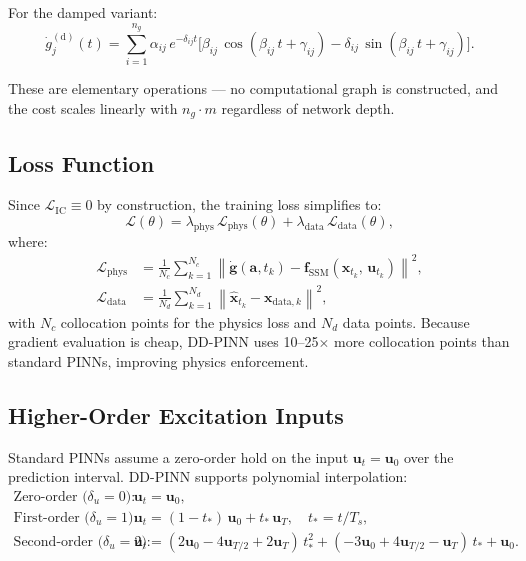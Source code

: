 \documentclass[11pt]{article}
\newcommand{\xhat}{\hat{\bm{x}}}
\newcommand{\avec}{\bm{a}}
\newcommand{\uvec}{\bm{u}}
\newcommand{\xvec}{\bm{x}}
\newcommand{\fssm}{\bm{f}_{\mathrm{SSM}}}
\begin{document}
For the damped variant:
\begin{equation}
    \dot{g}_j^{(\mathrm{d})}(t) = \sum_{i=1}^{n_g} \alpha_{ij}\, e^{-\delta_{ij} t} \Big[ \beta_{ij}\, \cos(\beta_{ij}\, t + \gamma_{ij}) - \delta_{ij}\, \sin(\beta_{ij}\, t + \gamma_{ij}) \Big].
    \label{eq:closed-form-grad-damped}
\end{equation}

These are elementary operations --- no computational graph is constructed, and the cost scales linearly with $n_g \cdot m$ regardless of network depth.

\subsection{Loss Function}

Since $\mathcal{L}_{\mathrm{IC}} \equiv 0$ by construction, the training loss simplifies to:
\begin{equation}
    \mathcal{L}(\theta) = \lambda_{\mathrm{phys}}\, \mathcal{L}_{\mathrm{phys}}(\theta) + \lambda_{\mathrm{data}}\, \mathcal{L}_{\mathrm{data}}(\theta),
    \label{eq:ddpinn-loss}
\end{equation}
where:
\begin{align}
    \mathcal{L}_{\mathrm{phys}} &= \frac{1}{N_c} \sum_{k=1}^{N_c} \left\| \dot{\bm{g}}(\avec, t_k) - \fssm(\xhat_{t_k},\, \uvec_{t_k}) \right\|^2, \label{eq:phys-loss} \\
    \mathcal{L}_{\mathrm{data}} &= \frac{1}{N_d} \sum_{k=1}^{N_d} \left\| \xhat_{t_k} - \xvec_{\mathrm{data},k} \right\|^2, \label{eq:data-loss}
\end{align}
with $N_c$ collocation points for the physics loss and $N_d$ data points. Because gradient evaluation is cheap, DD-PINN uses 10--25$\times$ more collocation points than standard PINNs, improving physics enforcement.

\subsection{Higher-Order Excitation Inputs}

Standard PINNs assume a zero-order hold on the input $\uvec_t = \uvec_0$ over the prediction interval. DD-PINN supports polynomial interpolation:
\begin{align}
    \text{Zero-order ($\delta_u = 0$):} &\quad \uvec_t = \uvec_0, \\
    \text{First-order ($\delta_u = 1$):} &\quad \uvec_t = (1 - t_*)\, \uvec_0 + t_*\, \uvec_T, \quad t_* = t/T_s, \\
    \text{Second-order ($\delta_u = 2$):} &\quad \uvec_t = (2\uvec_0 - 4\uvec_{T/2} + 2\uvec_T)\, t_*^2 + (-3\uvec_0 + 4\uvec_{T/2} - \uvec_T)\, t_* + \uvec_0.
\end{align}
\end{document}
